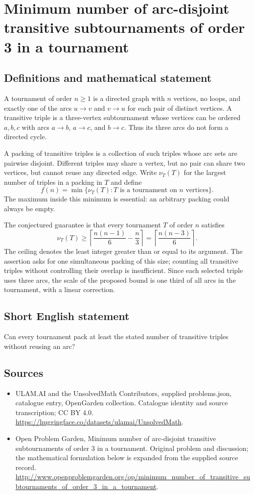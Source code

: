 \documentclass[11pt,a4paper]{article}
\begin{document}
\section*{Minimum number of arc-disjoint transitive subtournaments of order 3 in a tournament}\label{statement}

\subsection{Definitions and mathematical statement}
A tournament of order $n\geq1$ is a directed graph with $n$ vertices,
no loops, and exactly one of the arcs $u\to v$ and $v\to u$ for each
pair of distinct vertices. A transitive triple is a three-vertex
subtournament whose vertices can be ordered $a,b,c$ with arcs
$a\to b$, $a\to c$, and $b\to c$. Thus its three arcs do not form
a directed cycle.

A packing of transitive triples is a collection of such triples whose
arc sets are pairwise disjoint. Different triples may share a vertex, but no pair can share
two vertices, but cannot reuse any directed edge. Write $\nu_T(T)$
for the largest number of triples in a packing in $T$ and define
\[
 f(n)=\min\{\nu_T(T):T\text{ is a tournament on }n\text{ vertices}\}.
\]
The maximum inside this minimum is essential: an arbitrary packing
could always be empty.

The conjectured guarantee is that every tournament $T$ of order $n$
satisfies
\[
 \nu_T(T)\geq
 \left\lceil\frac{n(n-1)}6-\frac n3\right\rceil
 =\left\lceil\frac{n(n-3)}6\right\rceil.
\]
The ceiling denotes the least integer greater than or equal to its
argument. The assertion asks for one simultaneous packing of this
size; counting all transitive triples without controlling their
overlap is insufficient. Since each selected triple uses three arcs,
the scale of the proposed bound is one third of all arcs in the
tournament, with a linear correction.
\subsection{Short English statement}
Can every tournament pack at least the stated number of transitive triples without reusing an arc?
\subsection{Sources}
\begin{itemize}
\item[S1] ULAM.AI and the UnsolvedMath Contributors, supplied problems.json, catalogue entry, OpenGarden collection. Catalogue identity and source transcription; CC BY 4.0.
\url{https://huggingface.co/datasets/ulamai/UnsolvedMath}.
\item[S2] Open Problem Garden, Minimum number of arc-disjoint transitive subtournaments of order 3 in a tournament. Original problem and discussion; the mathematical formulation below is expanded from the supplied source record.
\url{http://www.openproblemgarden.org/op/minimum_number_of_transitive_subtournaments_of_order_3_in_a_tournament}.
\end{itemize}
\end{document}
